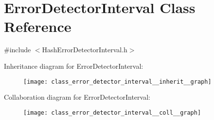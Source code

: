 \hypertarget{class_error_detector_interval}{}\section{Error\+Detector\+Interval Class Reference}
\label{class_error_detector_interval}


{\ttfamily \#include $<$Hash\+Error\+Detector\+Interval.\+h$>$}



Inheritance diagram for Error\+Detector\+Interval\+:\nopagebreak
\begin{figure}[H]
\begin{center}
\leavevmode
\texttt{[image: class\_error\_detector\_interval\_\_inherit\_\_graph]}
\end{center}
\end{figure}


Collaboration diagram for Error\+Detector\+Interval\+:\nopagebreak
\begin{figure}[H]
\begin{center}
\leavevmode
\texttt{[image: class\_error\_detector\_interval\_\_coll\_\_graph]}
\end{center}
\end{figure}

